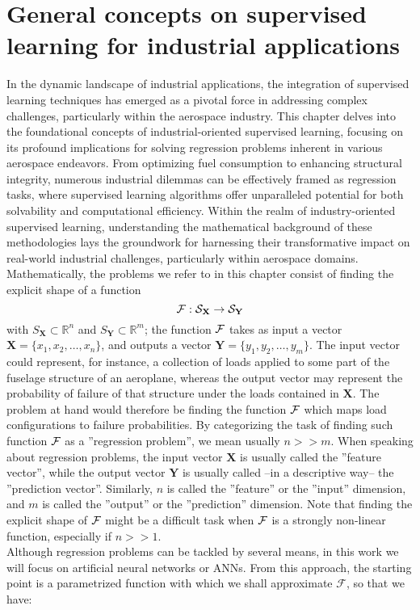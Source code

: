 \chapter{General concepts on supervised learning for industrial applications}
In the dynamic landscape of industrial applications, the integration of supervised learning techniques has emerged as a pivotal force in addressing complex challenges, particularly within the aerospace industry. This chapter delves into the foundational concepts of industrial-oriented supervised learning, focusing on its profound implications for solving regression problems inherent in various aerospace endeavors. From optimizing fuel consumption\cite{hong2018data} to enhancing structural integrity\cite{pfingstl2023warped}, numerous industrial dilemmas can be effectively framed as regression tasks, where supervised learning algorithms offer unparalleled potential for both solvability and computational efficiency. Within the realm of industry-oriented supervised learning, understanding the mathematical background of these methodologies lays the groundwork for harnessing their transformative impact on real-world industrial challenges, particularly within aerospace domains.\\
%
\indent Mathematically, the problems we refer to in this chapter consist of finding the explicit shape of a function
\begin{equation}\label{eq:F}
	\cal{F}:S_{\mathbf{X}}\rightarrow S_{\mathbf{Y}}
\end{equation}
with $S_{\mathbf{X}}\subset\mathbb{R}^n$ and $S_{\mathbf{Y}}\subset\mathbb{R}^m$; \ie the function $\cal{F}$ takes as input a vector $\mathbf{X}=\{x_1,x_2,\ldots,x_n\}$, and outputs a vector $\mathbf{Y}=\{y_1,y_2,\ldots,y_m\}$. The input vector could represent, for instance, a collection of loads applied to some part of the fuselage structure of an aeroplane, whereas the output vector may represent the probability of failure of that structure under the loads contained in $\mathbf{X}$. The problem at hand would therefore be finding the function $\cal{F}$ which maps load configurations to failure probabilities. By categorizing the task of finding such function $\cal{F}$ as a ''regression problem'', we mean usually $n>>m$. When speaking about regression problems, the input vector $\mathbf{X}$ is usually called the ''feature vector'', while the output vector $\mathbf{Y}$ is usually called --in a descriptive way-- the ''prediction vector''. Similarly, $n$ is called the ''feature'' or the ''input'' dimension, and $m$ is called the ''output'' or the ''prediction'' dimension. Note that finding the explicit shape of $\cal{F}$ might be a difficult task when $\cal{F}$ is a strongly non-linear function, especially if $n>>1$.\\
%
\indent Although regression problems can be tackled by several means, in this work we will focus on artificial neural networks or ANNs\cite{Marsland2015Machine}. From this approach, the starting point is a parametrized function with which we shall approximate $\mathcal{F}$, so that we have:

